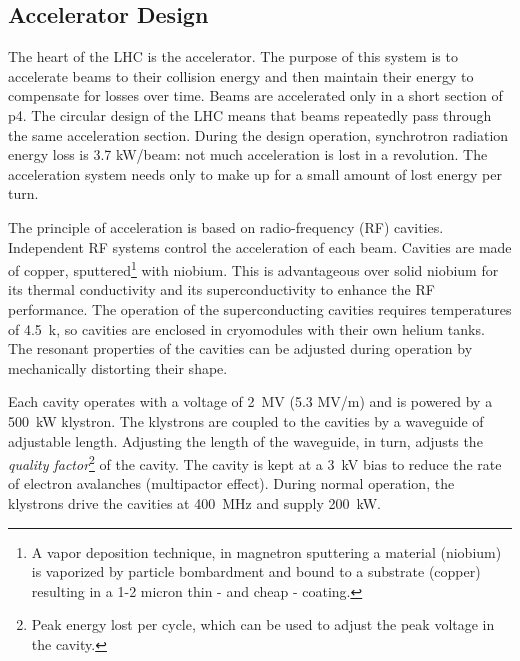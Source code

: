 \subsection{Accelerator Design}
The heart of the LHC is the accelerator.
The purpose of this system is to accelerate beams to their collision energy and then maintain their energy to compensate for losses over time.
Beams are accelerated only in a short section of p4.
The circular design of the LHC means that beams repeatedly pass through the same acceleration section.
During the design operation, synchrotron radiation energy loss is 3.7 kW/beam: not much acceleration is lost in a revolution.
The acceleration system needs only to make up for a small amount of lost energy per turn.

The principle of acceleration is based on radio-frequency (RF) cavities.
Independent RF systems control the acceleration of each beam.
Cavities are made of copper, sputtered\footnote{A vapor deposition technique, in magnetron sputtering a material (niobium) is vaporized by particle bombardment and bound to a substrate (copper) resulting in a 1-2 micron thin - and cheap - coating.} with niobium.
This is advantageous over solid niobium for its thermal conductivity and its superconductivity to enhance the RF performance.\cite{lyndon}
The operation of the superconducting cavities requires temperatures of 4.5~k, so cavities are enclosed in cryomodules with their own helium tanks. \cite{boussard}
The resonant properties of the cavities can be adjusted during operation by mechanically distorting their shape.

Each cavity operates with a voltage of 2~MV (5.3 MV/m) and is powered by a 500~kW klystron.
The klystrons are coupled to the cavities by a waveguide of adjustable length.
Adjusting the length of the waveguide, in turn, adjusts the \emph{quality factor}\footnote{Peak energy lost per cycle, which can be used to adjust the peak voltage in the cavity.} of the cavity.
The cavity is kept at a 3~kV bias to reduce the rate of electron avalanches (multipactor effect).
During normal operation, the klystrons drive the cavities at 400~MHz and supply 200~kW.

